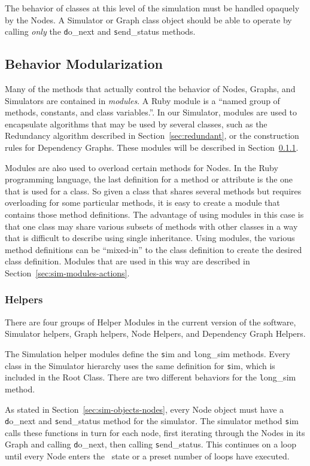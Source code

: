 The behavior of classes at this level of the simulation must be handled opaquely by the Nodes. A Simulator or Graph class object should be able to operate by calling {\em only} the {\texttt do\_next} and {\texttt send\_status} methods.

\subsection{Behavior Modularization}
\label{sec:sim-modules}
Many of the methods that actually control the behavior of Nodes, Graphs, and Simulators are contained in {\em modules}. A Ruby module is a ``named group of methods, constants, and class variables.''\cite{1408408}. In our Simulator, modules are used to encapsulate algorithms that may be used by several classes, such as the Redundancy algorithm described in Section~\ref{sec:redundant}, or the construction rules for Dependency Graphs. These modules will be described in Section~\ref{sec:sim-modules-helpers}.

Modules are also used to overload certain methods for Nodes. In the Ruby programming language, the last definition for a method or attribute is the one that is used for a class. So given a class that shares several methods but requires overloading for some particular methods, it is easy to create a module that contains those method definitions. The advantage of using modules in this case is that one class may share various subsets of methods with other classes in a way that is difficult to describe using single inheritance. Using modules, the various method definitions can be ``mixed-in'' to the class definition to create the desired class definition. Modules that are used in this way are described in Section~\ref{sec:sim-modules-actions}.

\subsubsection{Helpers}
\label{sec:sim-modules-helpers}
There are four groups of Helper Modules in the current version of the software, Simulator helpers, Graph helpers, Node Helpers, and Dependency Graph Helpers. 

The Simulation helper modules define the {\texttt sim} and {\texttt long\_sim} methods. Every class in the Simulator hierarchy uses the same definition for {\texttt sim}, which is included in the Root Class. There are two different behaviors for the {\texttt long\_sim} method. 

As stated in Section~\ref{sec:sim-objects-nodes}, every Node object must have a {\texttt do\_next} and {\texttt send\_status} method for the simulator. The simulator method {\texttt sim} calls these functions in turn for each node, first iterating through the Nodes in its Graph and calling {\texttt do\_next}, then calling {\texttt send\_status}. This continues on a loop until every Node enters the \cDd\ state or a preset number of loops have executed. 

